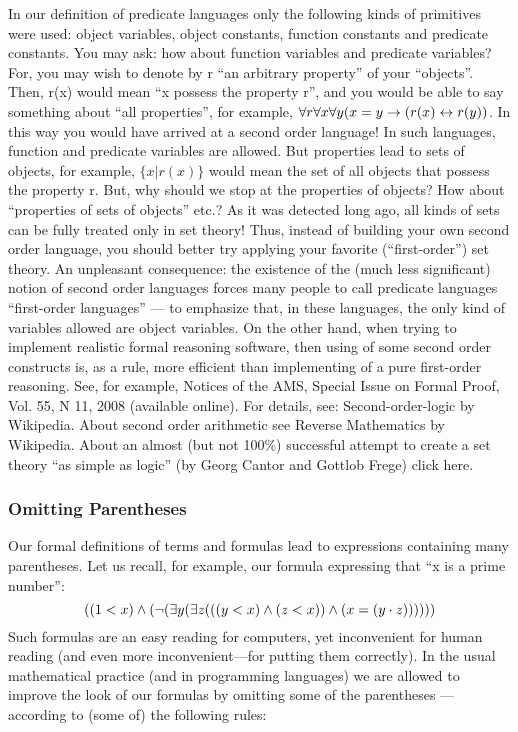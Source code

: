 In our definition of predicate languages only the following kinds of primitives were used: object variables, object constants,
function constants and predicate constants. You may ask: how about function variables and predicate variables? For, you
may wish to denote by r ``an arbitrary property'' of your ``objects''. Then, r(x) would mean ``x possess the property r'', and you
would be able to say something about ``all properties'', for example, \(\forall r\forall x \forall y(x=y\rightarrow (r(x)\leftrightarrow r(y))\). In this way you would have
arrived at a second order language! In such languages, function and predicate variables are allowed. But properties lead to
sets of objects, for example, \(\{x | r(x)\}\) would mean the set of all objects that possess the property r. But, why should we stop at
the properties of objects? How about ``properties of sets of objects'' etc.? As it was detected long ago, all kinds of sets can be
fully treated only in set theory! Thus, instead of building your own second order language, you should better try applying your
favorite (``first-order'') set theory. An unpleasant consequence: the existence of the (much less significant) notion of second
order languages forces many people to call predicate languages ``first-order languages'' --- to emphasize that, in these
languages, the only kind of variables allowed are object variables.
On the other hand, when trying to implement realistic formal reasoning software, then using of some second order constructs
is, as a rule, more efficient than implementing of a pure first-order reasoning. See, for example, Notices of the AMS, Special
Issue on Formal Proof, Vol. 55, N 11, 2008 (available online).
For details, see: Second-order-logic by Wikipedia. About second order arithmetic see Reverse Mathematics by Wikipedia.
About an almost (but not 100\%) successful attempt to create a set theory ``as simple as logic'' (by Georg Cantor and Gottlob
Frege) click here.

\subsubsection*{Omitting Parentheses}

Our formal definitions of terms and formulas lead to expressions containing many parentheses. Let us recall, for example, our formula expressing that ``x is a prime number'':
\[
((1<x)\wedge (\neg (\exists y(\exists z(((y<x)\wedge (z<x))\wedge (x=(y\cdot z))))))
\]
Such formulas are an easy reading for computers, yet inconvenient for human reading (and even more inconvenient---for putting them correctly). In the usual mathematical practice (and in programming languages) we are allowed to improve the look of our formulas by omitting some of the parentheses --- according to (some of) the following rules:

